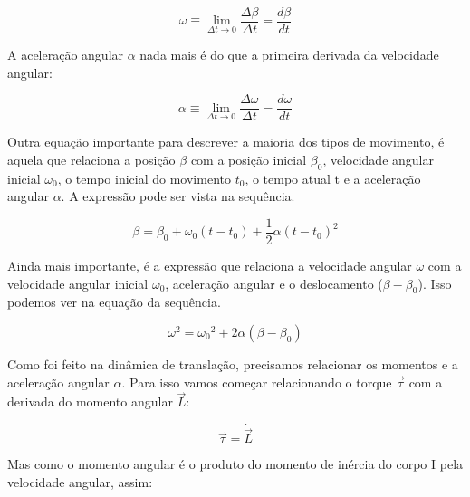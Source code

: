 \begin{equation}
\omega\equiv\lim_{\Delta t\rightarrow 0}\frac{\Delta\beta}{\Delta t}=\frac{d\beta}{dt}
\end{equation}

A aceleração angular $\alpha$ nada mais é do que a primeira derivada da velocidade angular:

\begin{equation}
\alpha\equiv\lim_{\Delta t\rightarrow 0}\frac{\Delta\omega}{\Delta t}=\frac{d\omega}{dt}
\end{equation}



Outra equação importante para descrever a maioria dos tipos de movimento, é aquela que relaciona a posição $\beta$ com a posição inicial $\beta_0$, velocidade angular inicial $\omega_0$, o tempo inicial do movimento $t_0$, o tempo atual t e a aceleração angular $\alpha$. A expressão pode ser vista na sequência.

\begin{equation}
\beta=\beta_{0}+\omega_{0}(t-t_{0})+\frac{1}{2}\alpha{(t-t_{0})}^{2}
\end{equation}

Ainda mais importante, é a expressão que relaciona a velocidade angular $\omega$ com a velocidade angular inicial $\omega_0$, aceleração angular e o deslocamento ($\beta-\beta_0$). Isso podemos ver na equação da sequência.

\begin{equation}
{\omega}^{2}={\omega_0}^{2}+2\alpha(\beta-\beta_0) 
\end{equation}

Como foi feito na dinâmica de translação, precisamos relacionar os momentos e a aceleração angular $\alpha$. Para isso vamos começar relacionando o torque $\vec{\tau}$ com a derivada do momento angular $\vec{L}$:

\begin{equation}
\vec{\tau}=\dot{\vec{L}}
\end{equation}

Mas como o momento angular é o produto do momento de inércia do corpo I pela velocidade angular, assim: 

